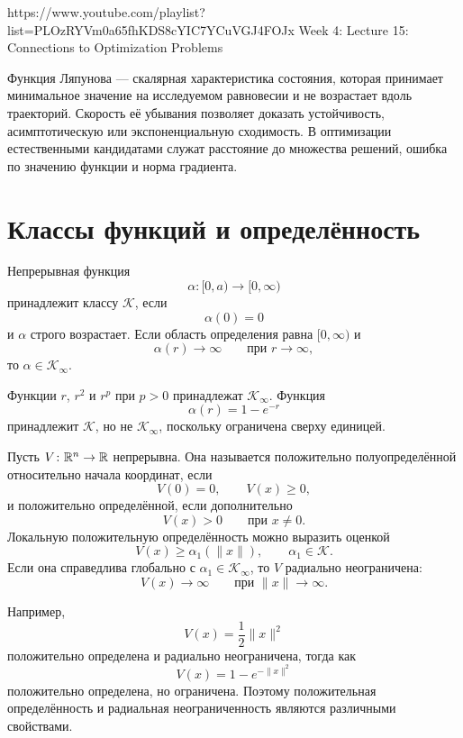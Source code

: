 
\sourcevideo
    {https://www.youtube.com/playlist?list=PLOzRYVm0a65fhKDS8cYIC7YCuVGJ4FOJx}
    {Week 4: Lecture 15: Connections to Optimization Problems}

Функция Ляпунова --- скалярная характеристика состояния, которая
принимает минимальное значение на исследуемом равновесии и не
возрастает вдоль траекторий. Скорость её убывания позволяет доказать
устойчивость, асимптотическую или экспоненциальную сходимость. В
оптимизации естественными кандидатами служат расстояние до множества
решений, ошибка по значению функции и норма градиента.

\section{Классы функций и определённость}

\begin{definition}
Непрерывная функция
\[
    \alpha\colon[0,a)\to[0,\infty)
\]
принадлежит классу \(\mathcal K\), если
\[
    \alpha(0)=0
\]
и \(\alpha\) строго возрастает. Если область определения равна
\([0,\infty)\) и
\[
    \alpha(r)\to\infty
    \qquad
    \text{при }r\to\infty,
\]
то \(\alpha\in\mathcal K_\infty\).
\end{definition}

Функции \(r\), \(r^2\) и \(r^p\) при \(p>0\) принадлежат
\(\mathcal K_\infty\). Функция
\[
    \alpha(r)=1-e^{-r}
\]
принадлежит \(\mathcal K\), но не \(\mathcal K_\infty\), поскольку
ограничена сверху единицей.

Пусть \(V\colon\mathbb{R}^n\to\mathbb{R}\) непрерывна. Она называется положительно
полуопределённой относительно начала координат, если
\[
    V(0)=0,
    \qquad
    V(x)\ge0,
\]
и положительно определённой, если дополнительно
\[
    V(x)>0
    \qquad
    \text{при }x\ne0.
\]
Локальную положительную определённость можно выразить оценкой
\[
    V(x)\ge\alpha_1(\lVert x\rVert),
    \qquad
    \alpha_1\in\mathcal K.
\]
Если она справедлива глобально с
\(\alpha_1\in\mathcal K_\infty\), то \(V\) радиально неограничена:
\[
    V(x)\to\infty
    \qquad
    \text{при }\lVert x\rVert\to\infty.
\]

Например,
\[
    V(x)=\frac12\lVert x\rVert^2
\]
положительно определена и радиально неограничена, тогда как
\[
    V(x)=1-e^{-\lVert x\rVert^2}
\]
положительно определена, но ограничена. Поэтому положительная
определённость и радиальная неограниченность являются различными
свойствами.

